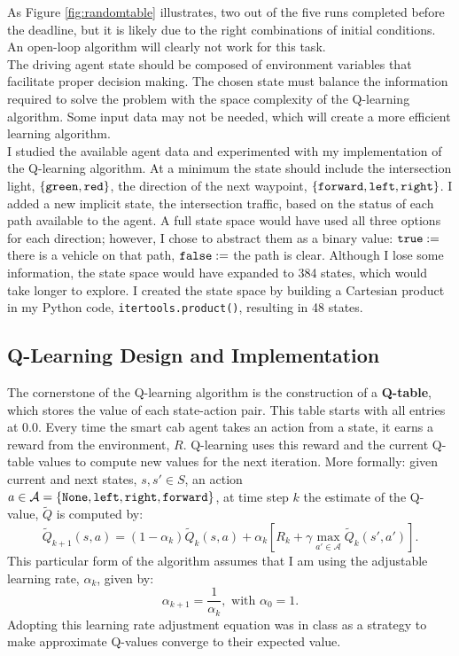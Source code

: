 \documentclass[12pt,letterpaper]{article}
\begin{document}
As Figure \ref{fig:randomtable} illustrates, two out of the five runs completed before the deadline, but it is likely due to the right combinations of initial conditions.
An open-loop algorithm will clearly not work for this task. \\

The driving agent state should be composed of environment variables that facilitate proper decision making.
The chosen state must balance the information required to solve the problem with the space complexity of the Q-learning algorithm.
Some input data may not be needed, which will create a more efficient learning algorithm. \\

I studied the available agent data and experimented with my implementation of the Q-learning algorithm.
At a minimum the state should include the intersection light, $\{\verb|green|,\verb|red|\}$, the direction of the next waypoint, $\{\verb|forward|,\verb|left|,\verb|right|\}$.
I added a new implicit state, the intersection traffic, based on the status of each path available to the agent.
A full state space would have used all three options for each direction; however, I chose to abstract them as a binary value: $\verb|true| := $ there is a vehicle on that path, $\verb|false|:=$ the path is clear.
Although I lose some information, the state space would have expanded to 384 states, which would take longer to explore.
I created the state space by building a Cartesian product in my Python code, \verb|itertools.product()|, resulting in 48 states.

\subsection*{Q-Learning Design and Implementation}

The cornerstone of the Q-learning algorithm is the construction of a {\bf Q-table}, which stores the value of each state-action pair.
This table starts with all entries at $0.0$.
Every time the smart cab agent takes an action from a state, it earns a reward from the environment, $R$.
Q-learning uses this reward and the current Q-table values to compute new values for the next iteration.
More formally: given current and next states, $s,s'\in S$, an action $a\in \mathcal{A}=\{\verb|None|,\verb|left|,\verb|right|,\verb|forward|\}$, at time step $k$ the estimate of the Q-value, $\tilde{Q}$ is computed by:
$$
	\tilde{Q}_{k+1}(s,a) = (1-\alpha_k)\tilde{Q}_{k}(s,a) + \alpha_k[R_k + \gamma \max_{a'\in\mathcal{A}}\tilde{Q}_k(s',a')].
$$
This particular form of the algorithm assumes that I am using the adjustable learning rate, $\alpha_k$, given by:
$$
	\alpha_{k+1} = \frac{1}{\alpha_k}, \textrm{ with } \alpha_0 = 1.
$$
Adopting this learning rate adjustment equation was in class as a strategy to make approximate Q-values converge to their expected value. \\
\end{document}
